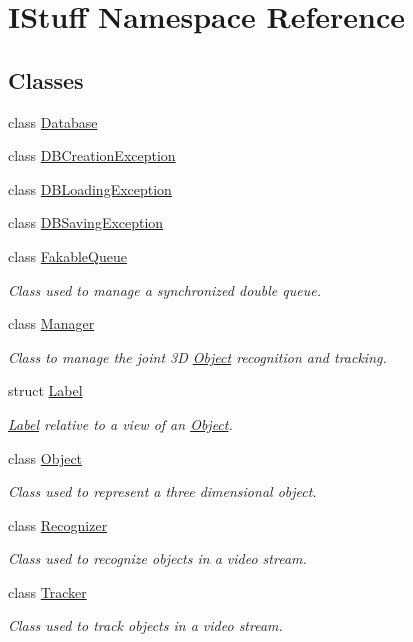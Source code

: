 \hypertarget{namespace_i_stuff}{\section{I\-Stuff Namespace Reference}
\label{namespace_i_stuff}
}
\subsection*{Classes}
\begin{DoxyCompactItemize}
\item 
class \hyperlink{class_i_stuff_1_1_database}{Database}
\item 
class \hyperlink{class_i_stuff_1_1_d_b_creation_exception}{D\-B\-Creation\-Exception}
\item 
class \hyperlink{class_i_stuff_1_1_d_b_loading_exception}{D\-B\-Loading\-Exception}
\item 
class \hyperlink{class_i_stuff_1_1_d_b_saving_exception}{D\-B\-Saving\-Exception}
\item 
class \hyperlink{class_i_stuff_1_1_fakable_queue}{Fakable\-Queue}
\begin{DoxyCompactList}\small\item\em Class used to manage a synchronized double queue. \end{DoxyCompactList}\item 
class \hyperlink{class_i_stuff_1_1_manager}{Manager}
\begin{DoxyCompactList}\small\item\em Class to manage the joint 3\-D \hyperlink{class_i_stuff_1_1_object}{Object} recognition and tracking. \end{DoxyCompactList}\item 
struct \hyperlink{struct_i_stuff_1_1_label}{Label}
\begin{DoxyCompactList}\small\item\em \hyperlink{struct_i_stuff_1_1_label}{Label} relative to a view of an \hyperlink{class_i_stuff_1_1_object}{Object}. \end{DoxyCompactList}\item 
class \hyperlink{class_i_stuff_1_1_object}{Object}
\begin{DoxyCompactList}\small\item\em Class used to represent a three dimensional object. \end{DoxyCompactList}\item 
class \hyperlink{class_i_stuff_1_1_recognizer}{Recognizer}
\begin{DoxyCompactList}\small\item\em Class used to recognize objects in a video stream. \end{DoxyCompactList}\item 
class \hyperlink{class_i_stuff_1_1_tracker}{Tracker}
\begin{DoxyCompactList}\small\item\em Class used to track objects in a video stream. \end{DoxyCompactList}\end{DoxyCompactItemize}
